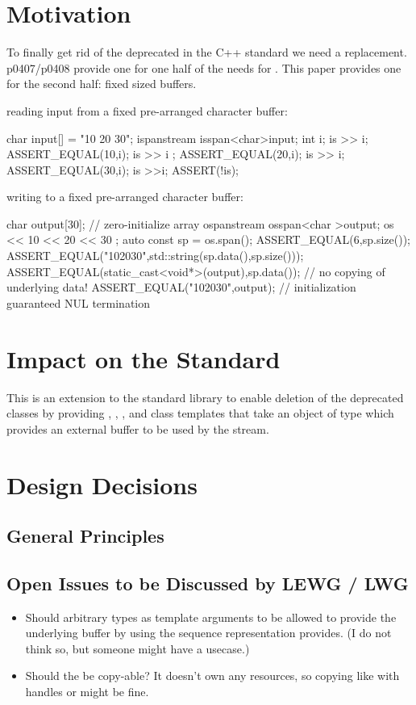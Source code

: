 \documentclass[ebook,11pt,article]{memoir}
\begin{document}
\chapter{Motivation}
To finally get rid of the deprecated  in the C++ standard we need a replacement. p0407/p0408 provide one for one half of the needs for . This paper provides one for the second half: fixed sized buffers. 

\begin{example} reading input from a fixed pre-arranged character buffer:
\begin{codeblock}
char input[] = "10 20 30";
ispanstream is{span<char>{input}};
int i;
is >> i;
ASSERT_EQUAL(10,i);
is >> i ;
ASSERT_EQUAL(20,i);
is >> i;
ASSERT_EQUAL(30,i);
is >>i;
ASSERT(!is);
\end{codeblock}
\end{example}
\begin{example} writing to a fixed pre-arranged character buffer:
\begin{codeblock}
char  output[30]{}; // zero-initialize array
ospanstream os{span<char >{output}};
os << 10 << 20 << 30 ;
auto const sp = os.span();
ASSERT_EQUAL(6,sp.size());
ASSERT_EQUAL("102030",std::string(sp.data(),sp.size()));
ASSERT_EQUAL(static_cast<void*>(output),sp.data()); // no copying of underlying data!
ASSERT_EQUAL("102030",output); // initialization guaranteed NUL termination
\end{codeblock}
\end{example}

\chapter{Impact on the Standard}
This is an extension to the standard library to enable deletion of the deprecated  classes by providing , , , and  class templates that take an object of type  which provides an external buffer to be used by the stream. 

\chapter{Design Decisions}
\section{General Principles}
\section{Open Issues to be Discussed by LEWG / LWG}
\begin{itemize}
\item Should arbitrary types as template arguments to  be allowed to provide the underlying buffer by using the  sequence representation  provides. (I do not think so, but someone might have a usecase.)
\item Should the  be copy-able? It doesn't own any resources, so copying like with handles or  might be fine.
\end{itemize}
\end{document}

